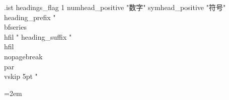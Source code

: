 \begin{filecontents*}[overwrite]{\jobname.ist}
headings_flag 1
numhead_positive "数字"
symhead_positive "符号"
heading_prefix "{\\bfseries\\hfil "
heading_suffix "\\hfil}\\nopagebreak\\par\\vskip 5pt "
\end{filecontents*}


\usepackage[a4paper,margin=28mm,headheight=15pt]{geometry}
\usepackage{amsmath,amssymb,mathtools,amsthm,bm}
\usepackage{aliascnt}
\usepackage{graphicx}
\usepackage{tikz}
\usetikzlibrary{patterns}
\usepackage{caption}
\captionsetup{labelsep=space}
\usepackage{booktabs,longtable,array}
\usepackage{multicol}
\usepackage{enumitem}
\usepackage{xcolor}
\usepackage{fancyhdr}
\usepackage{microtype}
\usepackage{hyperref}
\usepackage{imakeidx}
\makeindex[title={索引},noautomatic]
\usepackage[nameinlink,noabbrev]{cleveref}


\setcounter{secnumdepth}{3}
\setcounter{tocdepth}{2}
\renewcommand{\contentsname}{目录}
\renewcommand{\bibname}{参考文献}
\makeatletter
\renewcommand{\@pnumwidth}{2.2em}
\renewcommand{\@tocrmarg}{3.0em}
\newcommand{\stfhOpenTocStream}{%
  \immediate\openout\tf@toc=\jobname.toc\relax
}
\makeatother
\renewcommand{\figurename}{图}
\setlength{\parindent}{2em}
\setlength{\parskip}{0pt}
\emergencystretch=2em
\newcommand{\stfhPropertyLabel}[1]{\textnormal{\textbf{#1}}}

\pagestyle{fancy}
\fancyhf{}
\fancyhead[LE]{\small\thepage\quad\nouppercase{\leftmark}}
\fancyhead[RO]{\small\nouppercase{\rightmark}\quad\thepage}
\renewcommand{\headrulewidth}{0.4pt}

